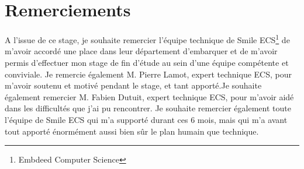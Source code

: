 \section{Remerciements}
  A l'issue de ce stage, je souhaite remercier l'équipe technique de Smile ECS\footnote{Embdeed Computer Science} de m'avoir accordé une place dans leur département d'embarquer et de m'avoir permis d'effectuer mon stage de fin d'étude au sein d'une équipe compétente et conviviale. Je remercie également M. Pierre Lamot, expert technique ECS, pour m'avoir soutenu et motivé pendant le stage, et tant apporté.Je souhaite également remercier M. Fabien Dutuit, expert technique ECS, pour m'avoir
  aidé dans les difficultés que j'ai pu rencontrer. Je souhaite remercier également toute l'équipe de Smile ECS qui m'a supporté durant ces 6 mois, mais qui m'a avant tout apporté énormément aussi bien sûr le plan humain que technique.
